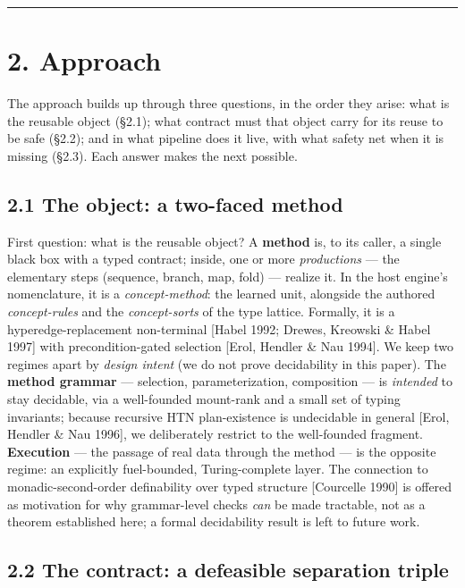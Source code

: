 \documentclass[11pt]{article}
\begin{document}
\medskip\hrule\medskip

\section*{2. Approach}

The approach builds up through three questions, in the order they arise: what is the reusable object (§2.1); what contract must that object carry for its reuse to be safe (§2.2); and in what pipeline does it live, with what safety net when it is missing (§2.3). Each answer makes the next possible.

\subsection*{2.1 The object: a two-faced method}

First question: what is the reusable object? A \textbf{method} is, to its caller, a single black box with a typed contract; inside, one or more \emph{productions} — the elementary steps (sequence, branch, map, fold) — realize it. In the host engine's nomenclature, it is a \emph{concept-method}: the learned unit, alongside the authored \emph{concept-rules} and the \emph{concept-sorts} of the type lattice. Formally, it is a hyperedge-replacement non-terminal [Habel 1992; Drewes, Kreowski \& Habel 1997] with precondition-gated selection [Erol, Hendler \& Nau 1994]. We keep two regimes apart by \emph{design intent} (we do not prove decidability in this paper). The \textbf{method grammar} — selection, parameterization, composition — is \emph{intended} to stay decidable, via a well-founded mount-rank and a small set of typing invariants; because recursive HTN plan-existence is undecidable in general [Erol, Hendler \& Nau 1996], we deliberately restrict to the well-founded fragment. \textbf{Execution} — the passage of real data through the method — is the opposite regime: an explicitly fuel-bounded, Turing-complete layer. The connection to monadic-second-order definability over typed structure [Courcelle 1990] is offered as motivation for why grammar-level checks \emph{can} be made tractable, not as a theorem established here; a formal decidability result is left to future work.

\subsection*{2.2 The contract: a defeasible separation triple}
\end{document}
